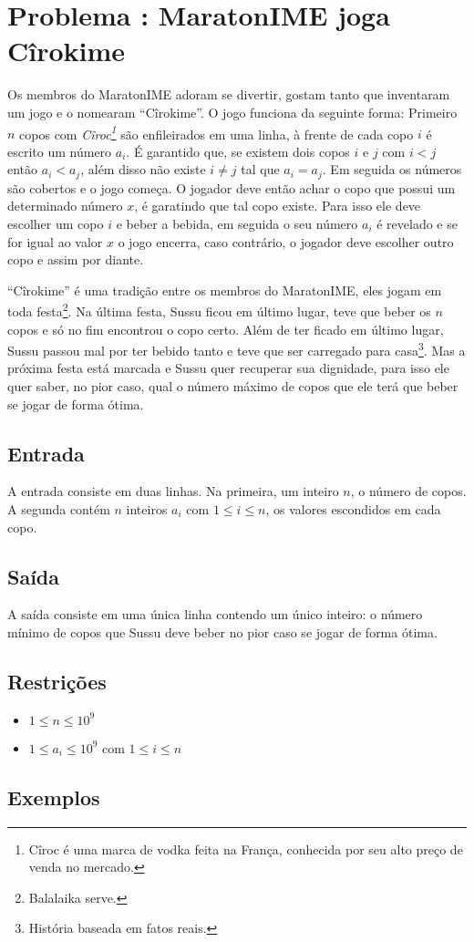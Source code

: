 \section*{Problema \proxLetra: MaratonIME joga Cîrokime}

Os membros do MaratonIME adoram se divertir, gostam tanto que inventaram um jogo e o nomearam ``Cîrokime''. O jogo funciona da seguinte forma:\newline 
Primeiro $n$ copos com \textit{Cîroc\footnote{Cîroc é uma marca de vodka feita na França, conhecida por seu alto preço de venda no mercado.}} são enfileirados em uma linha, à frente de cada copo $i$ é escrito um número $a_i$. É garantido que, se existem dois copos $i$ e $j$ com $i < j$ então $a_i < a_j$, além disso não existe $i \neq j$ tal que $a_i = a_j$. Em seguida os números são cobertos e o jogo começa.
O jogador deve então achar o copo que possui um determinado número $x$, é garatindo que tal copo existe. Para isso ele deve escolher um copo $i$ e beber a bebida, em seguida o seu número $a_i$ é revelado e se for igual ao valor $x$ o jogo encerra, caso contrário, o jogador deve escolher outro copo e assim por diante. 

``Cîrokime'' é uma tradição entre os membros do MaratonIME, eles jogam em toda festa\footnote{Balalaika serve.}. Na última festa, Sussu ficou em último lugar, teve que beber os $n$ copos e só no fim encontrou o copo certo. Além de ter ficado em último lugar, Sussu passou mal por ter bebido tanto e teve que ser carregado para casa\footnote{História baseada em fatos reais.}. Mas a próxima festa está marcada e Sussu quer recuperar sua dignidade, para isso ele quer saber, no pior caso, qual o número máximo de copos que ele terá que beber se jogar de forma ótima.

\subsection*{Entrada}
\textoDiversasInstanciasEOF

A entrada consiste em duas linhas. Na primeira, um inteiro $n$, o número de copos. A segunda contém $n$ inteiros $a_i$ com $1 \leq i \leq n$, os valores escondidos em cada copo.


\subsection*{Saída}

A saída consiste em uma única linha contendo um único inteiro: o número mínimo de copos que Sussu deve beber no pior caso se jogar de forma ótima.


\subsection*{Restrições}
\begin{itemize}
  \item $1 \leq n \leq 10^9$
  \item $1 \leq a_i \leq 10^9$ com $1 \leq i \leq n$
\end{itemize}

\subsection*{Exemplos}


